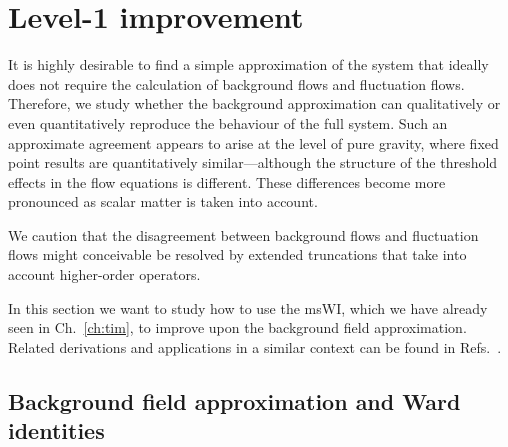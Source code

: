 \documentclass[11pt]{book}
\numberwithin{equation}{chapter}
\begin{document}
\section{Level-1 improvement}
\label{sec:Nielsen-id}

It is highly desirable to find a simple approximation of the system that ideally does not require
the calculation of background flows and fluctuation flows.
Therefore, we study whether the background approximation can qualitatively or even quantitatively
reproduce the behaviour of the full system.
Such an approximate agreement appears to arise at the level of pure gravity,
where fixed point results are quantitatively similar---although the structure of the threshold
effects in the flow equations is different.
These differences become more pronounced as scalar matter is taken into account.

We caution that the disagreement between background flows and fluctuation flows might conceivable
be resolved by extended truncations that take into account higher-order operators.

In this section we want to study how to use the msWI, which we have already
seen in Ch.~\ref{ch:tim}, to improve upon the background field approximation.
Related derivations and applications in a similar context can be found in
Refs.~\cite{
  Litim:2002ce, Litim:2002hj, Pawlowski:2003sk, PawlowskiH,
  Pawlowski:2005xe, Donkin ,Donkin:2012ud
}.

\subsection{Background field approximation and Ward identities}
\end{document}
